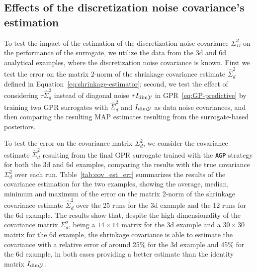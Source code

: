 \subsection[Effects of covariance estimation]{Effects of the discretization noise covariance's estimation}\label{sec:cov-est}

To test the impact of the estimation of the discretization noise covariance $\Sigma_D^2$ on the performance of the surrogate, we utilize the data from the 3d and 6d analytical examples, where the discretization noise covariance is known.
First we test the error on the matrix 2-norm of the shrinkage covariance estimate $\hat \Sigma_d^2$ defined in Equation~\eqref{eq:shrinkage-estimator}; second, we test the effect of considering $\tau \hat \Sigma_d^2$ instead of diagonal noise $\tau I_{\text{dim}\mathcal Y}$ in GPR~\eqref{eq:GP-predictive} by training two GPR surrogates with $\hat \Sigma_d^2$ and $I_{\text{dim} \mathcal Y}$ as data noise covariances, and then comparing the resulting MAP estimates resulting from the surrogate-based posteriors.\medskip


To test the error on the covariance matrix $\Sigma_d^2$, we consider the covariance estimate $\hat \Sigma_d^2$ resulting from the final GPR surrogate trained with the \texttt{AGP} strategy for both the 3d and 6d examples, comparing the results with the true covariance $\Sigma_d^2$ over each run.
Table~\ref{tab:cov_est_err} summarizes the results of the covariance estimation for the two examples, showing the average, median, minimum and maximum of the error on the matrix 2-norm of the shrinkage covariance estimate $\hat \Sigma_d^2$ over the 25 runs for the 3d example and the 12 runs for the 6d example. \newline
The results show that, despite the high dimensionality of the covariance matrix $\Sigma_d^2$, being a $14\times 14$ matrix for the 3d example and a $30 \times 30$ matrix for the 6d example, the shrinkage covariance is able to estimate the covariance with a relative error of around 25\% for the 3d example and 45\% for the 6d example, in both cases providing a better estimate than the identity matrix $I_{\text{dim} \mathcal Y}$. \medskip

